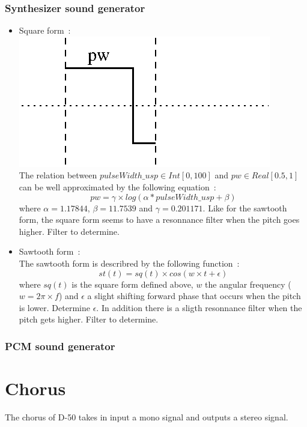 \documentclass[11pt]{report}
\newcommand{\question}[1]{{\color{Green}#1}}
\begin{document}
\subsubsection{Synthesizer sound generator}
\begin{itemize} 
  \item Square form~: \\
    \includegraphics{pulsewidth.eps}  \\
    The relation between
    $pulseWidth\_usp \in Int[0,100]$ and $pw\in Real[0.5,1]$ can be
    well approximated by the following equation~:
    \[pw = \gamma \times log(\alpha * pulseWidth\_usp + \beta)\]
    where $\alpha = 1.17844$, $\beta = 11.7539$ and $\gamma = 0.201171$.
    \question{Like for the sawtooth form,
      the square form seems to have a resonnance
      filter when the pitch goes higher. Filter to determine.}
  \item Sawtooth form~:\\
    The sawtooth form is describred by the following function~:
    \[st(t) = sq(t) \times cos(w\times t + \epsilon)\]
    where $sq(t)$ is the square form defined above, $w$ the
    angular frequency ($w = 2\pi\times f$) and $\epsilon$
    a slight shifting forward phase that occurs when the pitch is lower.
    \question{Determine $\epsilon$.}
    In addition there is a sligth resonnance filter when the pitch
    gets higher. \question{Filter to determine.}
\end{itemize}

\subsubsection{PCM sound generator}

\section{Chorus}
The chorus of D-50 takes in input a mono signal
and outputs a stereo signal.
\end{document}
